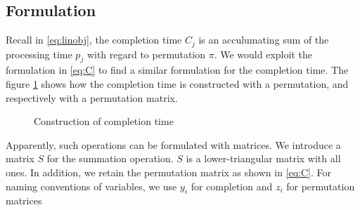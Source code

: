 \documentclass[12pt,letterpaper]{article}
\begin{document}
\subsection{Formulation}
Recall in \ref{eq:linobj}, the completion time $C_j$ is 
an acculumating sum of the processing time $p_j$ with regard to 
permutation $\pi$. We would exploit the formulation in \ref{eq:C} 
to find a similar formulation for the completion time. The figure \ref{fig:completion}
shows how the completion time is constructed with a permutation, and respectively with a permutation matrix.
\begin{figure}[h!]
    \centering
    \caption{Construction of completion time}
    \label{fig:completion}
\end{figure}
Apparently, such operations can be formulated with matrices. 
We introduce a matrix $S$ for the summation operation. $S$ is a lower-triangular matrix with all ones.
In addition, we retain the permutation matrix as shown in \ref{eq:C}.
For naming conventions of variables, we use $y_i$ for completion and $z_i$ for permutation matrices 
\end{document}
